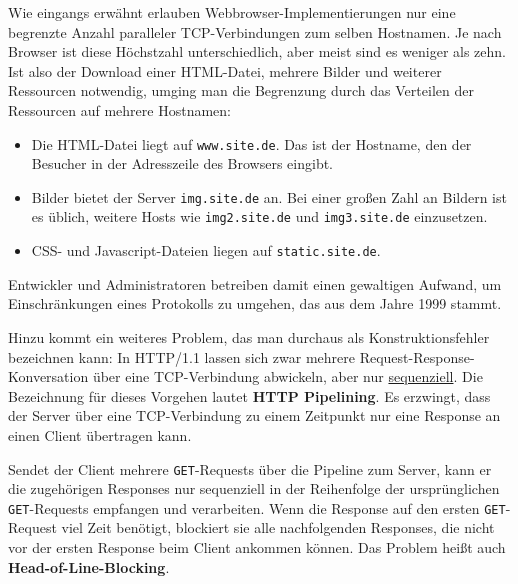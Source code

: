 \documentclass[a4paper, justified, notoc]{tufte-handout} %
\begin{document}
Wie eingangs erwähnt erlauben Webbrowser-Implementierungen nur eine begrenzte Anzahl paralleler TCP-Verbindungen zum selben Hostnamen. Je nach Browser ist diese Höchstzahl unterschiedlich, aber meist sind es weniger als zehn. Ist also der Download einer HTML-Datei, mehrere Bilder und weiterer Ressourcen notwendig, umging man die Begrenzung durch das Verteilen der Ressourcen auf mehrere Hostnamen:

\begin{itemize}
	\item Die HTML-Datei liegt auf \texttt{www.site.de}. Das ist der Hostname, den der Besucher in der Adresszeile des Browsers eingibt.
	\item Bilder bietet der Server \texttt{img.site.de} an. Bei einer großen Zahl an Bildern ist es üblich, weitere Hosts wie \texttt{img2.site.de} und \texttt{img3.site.de} einzusetzen.
	\item CSS- und Javascript-Dateien liegen auf \texttt{static.site.de}.
\end{itemize}
Entwickler und Administratoren betreiben damit einen gewaltigen Aufwand, um Einschränkungen eines Protokolls zu umgehen, das aus dem Jahre 1999 stammt.

Hinzu kommt ein weiteres Problem, das man durchaus als Konstruktionsfehler bezeichnen kann: In HTTP/1.1 lassen sich zwar mehrere Request-Response-Konversation über eine TCP-Verbindung abwickeln, aber nur \underline{sequenziell}. Die Bezeichnung für dieses Vorgehen lautet \textbf{HTTP Pipelining}. Es erzwingt, dass der Server über eine TCP-Verbindung zu einem Zeitpunkt nur eine Response an einen Client übertragen kann.

Sendet der Client mehrere \texttt{GET}-Requests über die Pipeline zum Server, kann er die zugehörigen Responses nur sequenziell in der Reihenfolge der ursprünglichen \texttt{GET}-Requests empfangen und verarbeiten. Wenn die Response auf den ersten \texttt{GET}-Request viel Zeit benötigt, blockiert sie alle nachfolgenden Responses, die nicht vor der ersten Response beim Client ankommen können. Das Problem heißt auch \textbf{Head-of-Line-Blocking}.

%
\end{document}
